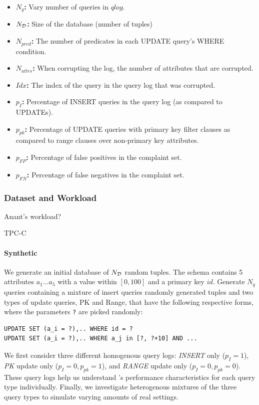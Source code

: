 \begin{itemize}
\item {\bf $N_q$:} Vary number of queries in $qlog$.
\item {\bf $N_{\cal D}$: } Size of the database (number of tuples)
\item {\bf $N_{pred}$:} The number of predicates in each UPDATE query's WHERE condition.
\item {\bf $N_{attrs}$: } When corrupting the log, the number of attributes that are corrupted.
\item {\bf $Idx$: } The index of the query in the query log that was corrupted.
\item {\bf $p_{I}$: } Percentage of INSERT queries in the query log (as compared to UPDATEs).
\item {\bf $p_{pk}$: } Percentage of UPDATE queries with primary key filter clauses as compared to range clauses over non-primary key attributes.
\item {\bf $p_{FP}$: } Percentage of false positives in the complaint set.
\item {\bf $p_{FN}$: } Percentage of false negatives in the complaint set.
\end{itemize}

\subsubsection{Dataset and Workload}

Anant's workload?

TPC-C

\paragraph{Synthetic}

We generate an initial database of $N_{\cal D}$ random tuples.  
The schema contains 5 attributes $a_1\ldots a_5$ with a value
within $[0, 100]$ and a primary key $id$. 
Generate $N_q$ queries containing a mixture of insert queries  randomly generated tuples and two types of update
queries, PK and Range, that have the following respective forms, 
where the parameters \verb|?| are picked randomly:

{\scriptsize
\begin{verbatim}
UPDATE SET (a_i = ?),.. WHERE id = ?
UPDATE SET (a_i = ?),.. WHERE a_j in [?, ?+10] AND ...
\end{verbatim}
}

We first consider three different homogenous query logs: {\it INSERT} only ($p_I = 1$), 
{\it PK} update only ($p_I = 0, p_{pk} = 1$), and {\it RANGE} update only ($p_I = 0, p_{pk} = 0$).
These query logs help us understand \sys's performance characteristics for each query type individually.  
Finally, we investigate heterogenous mixtures of the three query types to simulate varying amounts of real settings.

